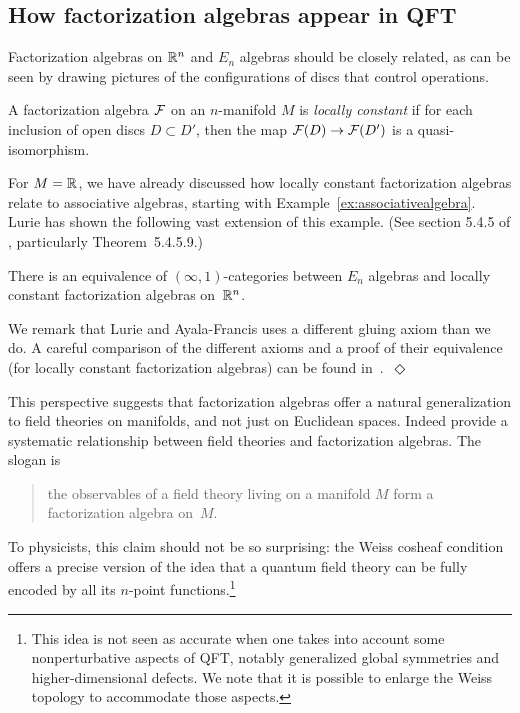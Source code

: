 \documentclass[11pt]{amsart}
\begin{document}
\subsection{How factorization algebras appear in QFT}
\label{s:factinqft}

Factorization algebras on $\mathbb R^n$ and $E_n$ algebras should be closely related,
as can be seen by drawing pictures of the configurations of discs that control operations.

\begin{dfn}
A factorization algebra $\mathcal F$ on an $n$-manifold $M$ is \emph{locally constant} if for each inclusion of open discs $D \subset D'$, then the map $\mathcal F(D) \to \mathcal F(D')$ is a quasi-isomorphism.
\end{dfn}

For $M = \mathbb R$, we have already discussed how locally constant factorization algebras relate to associative algebras, starting with Example~\ref{ex:associativealgebra}.
Lurie has shown the following vast extension of this example. (See section 5.4.5 of \cite{LurieHA}, particularly Theorem~5.4.5.9.)

\begin{thm}\label{thm:locisen}
There is an equivalence of $(\infty,1)$-categories between $E_n$ algebras and locally constant factorization algebras on~$\mathbb R^n$.  
\end{thm}  

\begin{rmk}
We remark that Lurie and Ayala-Francis uses a different gluing axiom than we do. A careful comparison of the different axioms and a proof of their equivalence (for locally constant factorization algebras) can be found in~\cite{KSW}.~\hfill $\Diamond$
\end{rmk}

This perspective suggests that factorization algebras offer a natural generalization to field theories on manifolds, and not just on Euclidean spaces. Indeed \cite{CG1, CG2} provide a systematic relationship between field theories and factorization algebras.
The slogan is 
\begin{quote}
the observables of a field theory living on a manifold $M$ form a factorization algebra on~$M$. 
\end{quote}
To physicists, this claim should not be so surprising:
the Weiss cosheaf condition offers a precise version of the idea that a quantum field theory can be fully encoded by all its $n$-point functions.\footnote{This idea is not seen as accurate when one takes into account some nonperturbative aspects of QFT, notably generalized global symmetries and higher-dimensional defects. We note that it is possible to enlarge the Weiss topology to accommodate those aspects.}
\end{document}

